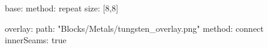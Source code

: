 base:
  method: repeat
  size: [8,8]
  
overlay:
  path: "Blocks/Metals/tungsten_overlay.png"
  method: connect
  innerSeams: true